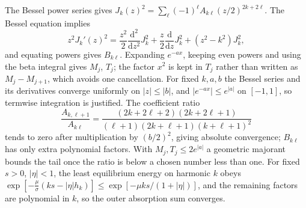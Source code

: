 \documentclass[11pt,a4paper]{article}
\numberwithin{equation}{section}
\newcommand{\dd}{\mathrm{d}}
\begin{document}
The Bessel power series gives $J_k(z)^2=\sum_\ell(-1)^\ell A_{k\ell}(z/2)^{2k+2\ell}$.
The Bessel equation implies
\begin{equation}
z^2J_k'(z)^2=\frac{z^2}2\frac{\dd^2}{\dd z^2}J_k^2+\frac z2\frac{\dd}{\dd z}J_k^2+(z^2-k^2)J_k^2,
\end{equation}
and equating powers gives $B_{k\ell}$. Expanding $e^{-ax}$, keeping even powers and
using the beta integral gives $M_j$, $T_j$; the factor $x^2$ is kept in $T_j$ rather
than written as $M_j-M_{j+1}$, which avoids one cancellation. For fixed $k,a,b$
the Bessel series and its derivatives converge uniformly on $|z|\le|b|$, and
$|e^{-ax}|\le e^{|a|}$ on $[-1,1]$, so termwise integration is justified. The
coefficient ratio
\begin{equation}
\frac{A_{k,\ell+1}}{A_{k\ell}}=\frac{(2k+2\ell+2)(2k+2\ell+1)}{(\ell+1)(2k+\ell+1)(k+\ell+1)^2}
\end{equation}
tends to zero after multiplication by $(b/2)^2$, giving absolute convergence;
$B_{k\ell}$ has only extra polynomial factors. With $M_j,T_j\le2e^{|a|}$ a
geometric majorant bounds the tail once the ratio is below a chosen number
less than one. For fixed $s>0$, $|\eta|<1$, the least equilibrium energy on
harmonic $k$ obeys
$\exp[-\frac\mu\sigma(ks-|\eta|h_k)]\le\exp[-\mu ks/(1+|\eta|)]$, and the
remaining factors are polynomial in $k$, so the outer absorption sum
converges.
\end{document}
